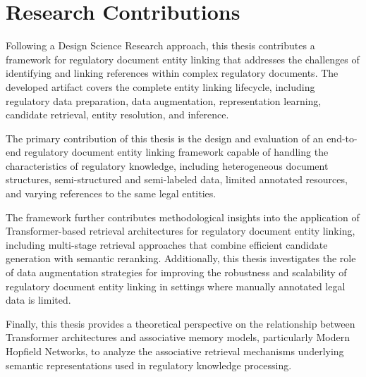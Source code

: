 \section{Research Contributions}

Following a Design Science Research approach, this thesis contributes a framework for regulatory document entity linking that addresses the challenges of identifying and linking references within complex regulatory documents. The developed artifact covers the complete entity linking lifecycle, including regulatory data preparation, data augmentation, representation learning, candidate retrieval, entity resolution, and inference.

The primary contribution of this thesis is the design and evaluation of an end-to-end regulatory document entity linking framework capable of handling the characteristics of regulatory knowledge, including heterogeneous document structures, semi-structured and semi-labeled data, limited annotated resources, and varying references to the same legal entities.

The framework further contributes methodological insights into the application of Transformer-based retrieval architectures for regulatory document entity linking, including multi-stage retrieval approaches that combine efficient candidate generation with semantic reranking. Additionally, this thesis investigates the role of data augmentation strategies for improving the robustness and scalability of regulatory document entity linking in settings where manually annotated legal data is limited.

Finally, this thesis provides a theoretical perspective on the relationship between Transformer architectures and associative memory models, particularly Modern Hopfield Networks, to analyze the associative retrieval mechanisms underlying semantic representations used in regulatory knowledge processing.

